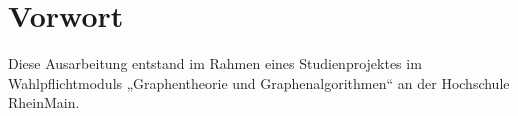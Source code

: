 \chapter*{Vorwort}
Diese Ausarbeitung entstand im Rahmen eines Studienprojektes im Wahlpflichtmoduls
„Graphentheorie und Graphenalgorithmen“ an der Hochschule RheinMain.
